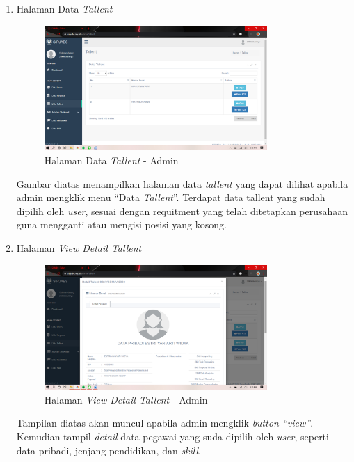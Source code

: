 \begin{enumerate}
	\item Halaman Data \textit{Tallent}
	\begin{figure}
		\centering
		\includegraphics[width=0.8\textwidth]
		{pics/admin/implementasi/datatallent.png}
		\caption{Halaman Data \textit{Tallent} - Admin}
		\label{fig:CC10}
	\end{figure}
	Gambar diatas menampilkan halaman data \textit{tallent} yang dapat dilihat apabila admin mengklik menu “Data \textit{Tallent}”. Terdapat data tallent yang sudah dipilih oleh \textit{user}, sesuai dengan requitment yang telah ditetapkan perusahaan guna mengganti atau mengisi posisi yang kosong.  
	
	\item Halaman \textit{View Detail Tallent}
	\begin{figure}
		\centering
		\includegraphics[width=0.8\textwidth]
		{pics/admin/implementasi/viewdetailtallent.png}
		\caption{Halaman \textit{View Detail Tallent} - Admin}
		\label{fig:CC10}
	\end{figure}
	Tampilan diatas akan muncul apabila admin mengklik \textit{button “view”}. Kemudian tampil \textit{detail} data pegawai yang suda dipilih oleh \textit{user}, seperti data pribadi, jenjang pendidikan, dan \textit{skill}. 
	

\end{enumerate}

